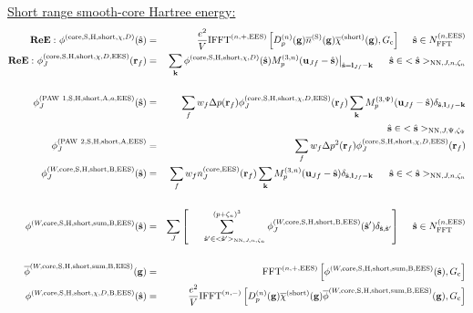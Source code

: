 \documentclass[paper=a4, fontsize=11pt]{article} %
\numberwithin{equation}{section} %
\numberwithin{figure}{section} %
\numberwithin{table}{section} %
\newcommand{\ol}{\overline}
\newcommand{\bu}{{\bf{u}}}
\newcommand{\bl}{{\bf{l}}}
\newcommand{\bk}{{\bf{k}}}
\newcommand{\bs}{{\bf{s}}}
\newcommand{\bg}{{\bf{g}}}
\newcommand{\br}{{\bf{r}}}
\newcommand{\hs}{{\hat{\bf{s}}}}
\newcommand{\rS}{{\mathrm{S}}}
\newcommand{\rEES}{{\mathrm{EES}}}
\newcommand{\rcore}{{\mathrm{core}}}
\newcommand{\rNN}{{\mathrm{NN}}}
\newcommand{\rshort}{{\mathrm{short}}}
\newcommand{\rP}{{\mathrm{PAW}}}
\newcommand{\rH}{{\mathrm{H}}}
\newcommand{\rA}{{\mathrm{A}}}
\newcommand{\rB}{{\mathrm{B}}}
\newcommand{\rsum}{{\mathrm{sum}}}
\newcommand{\NFFTnEES}{{N^{(n,\rEES)}_{\mathrm{FFT}}}}
\newcommand{\Gc}{{G_{\mathrm{c}}}}
\newcommand{\Dng}{{D^{(n)}_p(\bg)}}
\newcommand{\Mn}{{M_p^{(3,n)}}}
\newcommand{\Mp}{{M_p^{(3,\Psi)}}}
\newcommand{\FFTnEES}{{\mathrm{FFT}^{(n,+,\rEES)}}}
\newcommand{\IFFTnEES}{{\mathrm{IFFT}^{(n,+,\rEES)}}}
\newcommand{\IFFTni}{{\mathrm{IFFT}^{(n,-)}}}
\newcommand{\pzn}{{(p+\zeta_n)^3}}
\newcommand{\hsJp}{{<\hs>_{\rNN,J,\Psi,\zeta_\Psi}}}
\newcommand{\hsJn}{{<\hs>_{\rNN,J,n,\zeta_n}}}
\newcommand{\hsinJp}{{\ \ \ \ \ \hs  \in  \hsJp}}
\newcommand{\hsinJn}{{\ \ \ \ \ \hs  \in  \hsJn}}
\newcommand{\hspJn}{{<\hs'>_{\rNN,J,n,\zeta_n}}}
\newcommand{\hspinJn}{{\ \ \ \ \ \hs'  \in  \hspJn}}
\newcommand{\hsinnEES}{{\ \ \ \ \hs \in \NFFTnEES}}
\newcommand{\ReE}{{{\bf ReE:\ }}}
\begin{document}
\underline{Short range smooth-core Hartree energy:}
\begin{eqnarray}
\ReE \phi^{(\rcore,\rS,\rH,\rshort,\chi,D)}(\hs)&=&\frac{e^2}{V} \IFFTnEES\left[\Dng \ol n^{(\rS)}(\bg)\ol \chi^{(\rshort)}(\bg),\Gc\right] \hsinnEES\\
\label{ReEphi:fcoreSHshortinC}
\ReE \phi_J^{(\rcore,\rS,\rH,\rshort,\chi,D,\rEES)}(\br_f) &=&\sum_{\bk} \phi^{(\rcore,\rS,\rH,\rshort,\chi,D)}(\hs)\Mn(\bu_{Jf}-\hat \bs)\big|_{\hat \bs=\bl_{Jf}-\bk} \hsinJn \nonumber\\
\\
\label{ReEphi:sPAW1SHshortAa}
\phi_J^{(\rP\ 1,\rS,\rH,\rshort,\rA,a,\rEES)}(\hs) &=& \sum_f w_f \Delta p(\br_f) \phi_J^{(\rcore,\rS,\rH,\rshort,\chi,D,\rEES)}(\br_f) \sum_{\bk} \Mp(\bu_{Jf}-\hat \bs)\delta_{\hat \bs,\bl_{Jf}-\bk} \nonumber\\
&\ &\hspace*{2.5in}\hsinJp \\
\label{phi:PAW2SHshortA}
\phi_J^{(\rP\ 2,\rS,\rH,\rshort,\rA,\rEES)}  &=& \sum_f w_f \Delta p^2(\br_f) \phi_J^{(\rcore,\rS,\rH,\rshort,\chi,D,\rEES)}(\br_f) \\
\phi_J^{(W,\rcore,\rS,\rH,\rshort,\rB,\rEES)}(\hs) & =& \sum_f w_f n_J^{(\rcore,\rEES)}(\br_f) \sum_{\bk} \Mn(\bu_{Jf}-\hat \bs)\delta_{\hat \bs,\bl_{Jf}-\bk} \hsinJn\nonumber\\
&\ &\\
\phi^{(W,\rcore,\rS,\rH,\rshort,\rsum,\rB,\rEES)}(\hs) & =& \sum_J \left[\sum_{\hspinJn}^\pzn \phi_J^{(W,\rcore,\rS,\rH,\rshort,\rB,\rEES)}(\hs') \delta_{\hs,\hs'}\right] \hsinnEES \nonumber\\
\\
\label{phi:phigHshortSlB}
\ol \phi^{(W,\rcore,\rS,\rH,\rshort,\rsum,\rB,\rEES)}(\bg) &=& \FFTnEES \left[\phi^{(W,\rcore,\rS,\rH,\rshort,\rsum,\rB,\rEES)}(\hs),\Gc\right]\\
\label{phi:phiHshortSlDchiB}
\phi^{(W,\rcore,\rS,\rH,\rshort,\chi,D,\rB,\rEES)}(\hs) &=& \frac{e^2}{V} \IFFTni \left[\Dng \ol \chi^{(\rshort)}(\bg) \ol \phi^{(W,\rcore,\rS,\rH,\rshort,\rsum,\rB,\rEES)}(\bg) ,\Gc\right]
\end{eqnarray}
\end{document}
